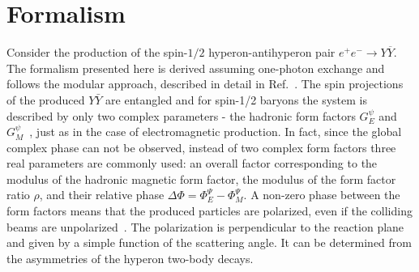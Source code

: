\section{Formalism}
\label{sec:formalism}
Consider the production of the spin-$1/2$ hyperon-antihyperon pair $e^+e^- \rightarrow Y\overline{Y}$. The formalism presented here is derived assuming one-photon exchange and follows the modular approach, described in detail in Ref.~\cite{Perotti:2018wxm}. The spin projections of the produced $Y\bar{Y}$ are entangled and for spin-1/2 baryons the system is described by only two complex parameters - the hadronic form factors $G_E^{\psi}$ and $G_M^{\psi}$~\cite{GF16+}, just as in the case of electromagnetic production. In fact, since the global complex phase can not be observed, instead of two complex form factors 
three real parameters are commonly used: an overall factor corresponding to the modulus of the
hadronic magnetic form factor, the modulus of the form factor ratio $\rho$, and their relative phase 
$\Delta\Phi=\Phi_E^\Psi-\Phi_M^\Psi$. A non-zero phase between the form factors means that the produced particles are polarized, even if the colliding beams are unpolarized~\cite{AZ96}. The polarization is perpendicular to the reaction plane and given by a simple function of the scattering angle. It can be determined from the asymmetries of the hyperon two-body decays.

